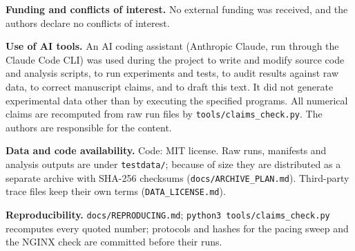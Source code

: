 \documentclass{ieeeaccess}
\begin{document}
\textbf{Funding and conflicts of interest.} No external funding was received, and the authors declare no conflicts of interest.


\textbf{Use of AI tools.} An AI coding assistant (Anthropic Claude, run through the Claude Code CLI) was used during the project to write and modify source code and analysis scripts, to run experiments and tests, to audit results against raw data, to correct manuscript claims, and to draft this text. It did not generate experimental data other than by executing the specified programs. All numerical claims are recomputed from raw run files by \texttt{tools/\allowbreak{}claims\_check.py}. The authors are responsible for the content.


\textbf{Data and code availability.} Code: MIT license. Raw runs, manifests and analysis outputs are under \texttt{testdata/\allowbreak{}}; because of size they are distributed as a separate archive with SHA-256 checksums (\texttt{docs/\allowbreak{}ARCHIVE\_PLAN.md}). Third-party trace files keep their own terms (\texttt{DATA\_\allowbreak{}LICENSE.md}).


\textbf{Reproducibility.} \texttt{docs/\allowbreak{}REPRODUCING.md}; \texttt{python3 tools/\allowbreak{}claims\_check.py} recomputes every quoted number; protocols and hashes for the pacing sweep and the NGINX check are committed before their runs.





\EOD
\end{document}
